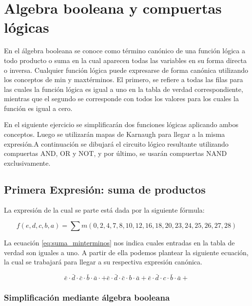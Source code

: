\section{Algebra booleana y compuertas lógicas}

En el álgebra booleana se conoce como término canónico de una función lógica a todo producto o suma en la cual aparecen todas las variables en su forma directa o inversa. Cualquier función lógica puede expresarse de forma canónica utilizando los conceptos de min y maxtérminos. El primero, se refiere a todas las filas para las cuales la función lógica es igual a uno en la tabla de verdad  correspondiente, mientras que el segundo se corresponde con todos los valores para los cuales la función es igual a cero. 

En el siguiente ejercicio se simplificarán dos funciones lógicas aplicando ambos conceptos. Luego se utilizarán mapas de Karnaugh para llegar a la misma expresión.A continuación se dibujará el circuito lógico resultante utilizando compuertas AND, OR y NOT, y por último, se usarán compuertas NAND exclusivamente.

\subsection{Primera Expresión: suma de productos}

La expresión de la cual se parte está dada por la siguiente fórmula:

\begin{equation}\label{eq:suma_minterminos}
f(e,d,c,b,a) = \sum{m(0, 2, 4, 7, 8, 10, 12, 16, 18, 20, 23, 24, 25, 26, 27, 28)}
\end{equation}

La ecuación \ref{eq:suma_minterminos} nos indica cuales entradas en la tabla de verdad son iguales a uno. A partir de ella podemos plantear la siguiente ecuación, la cual se trabajará para llegar a su respectiva expresión canónica.

\begin{equation}
\bar{e} \cdot \bar{d} \cdot \bar{c} \cdot \bar{b} \cdot \bar{a} \cdot + 
\bar{e} \cdot \bar{d} \cdot \bar{c} \cdot b \cdot \bar{a} +
\bar{e} 	\cdot \bar{d} \cdot c \cdot \bar{b} \cdot \bar{a} +

\end{equation}
\subsubsection{Simplificación mediante álgebra booleana}




